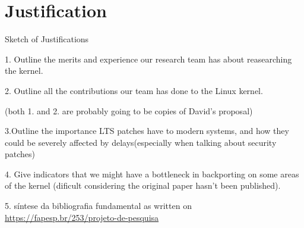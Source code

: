 \section{Justification}
\label{chp:justification}

Sketch of Justifications

1. Outline the merits and experience our research team has about reasearching the kernel.

2. Outline all the contributions our team has done to the Linux kernel.

(both 1. and 2. are probably going to be copies of David's proposal)

3.Outline the importance LTS patches have to modern systems, and how they could be severely affected by delays(especially when talking about security patches)

4. Give indicators that we might have a bottleneck in backporting on some areas of the kernel (dificult considering the original paper hasn't been published).

5. síntese da bibliografia fundamental as written on \href{FAPESP's page}{https://fapesp.br/253/projeto-de-pesquisa}